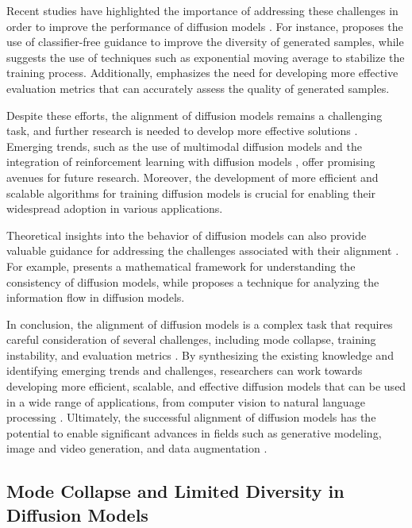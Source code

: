 \documentclass[11pt,a4paper]{article}
\begin{document}
Recent studies have highlighted the importance of addressing these challenges in order to improve the performance of diffusion models \cite{doi:10.1109/tkde.2024.3361474}. For instance, \cite{arxiv:2303.07576} proposes the use of classifier-free guidance to improve the diversity of generated samples, while \cite{doi:10.1111/cgf.15063} suggests the use of techniques such as exponential moving average to stabilize the training process. Additionally, \cite{arxiv:2410.00083} emphasizes the need for developing more effective evaluation metrics that can accurately assess the quality of generated samples.

Despite these efforts, the alignment of diffusion models remains a challenging task, and further research is needed to develop more effective solutions \cite{doi:10.1093/nsr/nwae348}. Emerging trends, such as the use of multimodal diffusion models \cite{doi:10.1109/iccv51070.2023.00713} and the integration of reinforcement learning with diffusion models \cite{arxiv:2305.13301}, offer promising avenues for future research. Moreover, the development of more efficient and scalable algorithms for training diffusion models \cite{arxiv:2502.06805} is crucial for enabling their widespread adoption in various applications.

Theoretical insights into the behavior of diffusion models can also provide valuable guidance for addressing the challenges associated with their alignment \cite{arxiv:2403.01639}. For example, \cite{arxiv:2402.07802} presents a mathematical framework for understanding the consistency of diffusion models, while \cite{arxiv:2406.05191} proposes a technique for analyzing the information flow in diffusion models.

In conclusion, the alignment of diffusion models is a complex task that requires careful consideration of several challenges, including mode collapse, training instability, and evaluation metrics \cite{arxiv:2408.10207}. By synthesizing the existing knowledge and identifying emerging trends and challenges, researchers can work towards developing more efficient, scalable, and effective diffusion models that can be used in a wide range of applications, from computer vision to natural language processing \cite{doi:10.1109/tpami.2025.3545047}. Ultimately, the successful alignment of diffusion models has the potential to enable significant advances in fields such as generative modeling, image and video generation, and data augmentation \cite{arxiv:2402.16369}.


\subsection{Mode Collapse and Limited Diversity in Diffusion Models}
\end{document}
